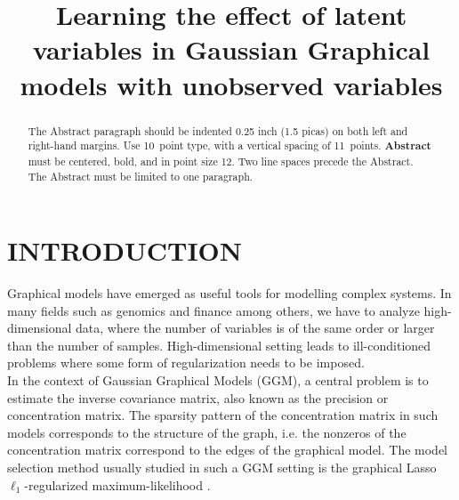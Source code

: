 \documentclass[letterpaper]{article}
\title{Learning the effect of latent variables in Gaussian Graphical models with unobserved variables}
\author{} %
\begin{document}
\maketitle

\begin{abstract}
The Abstract paragraph should be indented 0.25 inch (1.5 picas) on
both left and right-hand margins.  Use 10~point type, with a vertical
spacing of 11~points.  {\bf Abstract} must be centered, bold, and in
point size 12. Two line spaces precede the Abstract. The Abstract must
be limited to one paragraph.
\end{abstract}


\section{INTRODUCTION}
\label{intro}


Graphical models have emerged as useful tools for modelling complex systems. In many fields such as genomics and finance among others, we have to analyze high-dimensional data, where the number of variables is of the same order or larger than the number of samples.  High-dimensional setting leads to ill-conditioned problems where some form of regularization needs to be imposed.\\

In the context of Gaussian Graphical Models (GGM), a central problem is to estimate the inverse covariance matrix, also known as the precision or concentration matrix. The sparsity pattern of the concentration matrix in such models corresponds to the structure of the graph, i.e. the nonzeros of the concentration matrix correspond to the edges of the graphical model. The model selection method usually studied in such a GGM setting is the graphical Lasso $\ell_1$-regularized maximum-likelihood \citep{friedman2008sparse,yuan2007model,banerjee2008model}.\\
\end{document}
